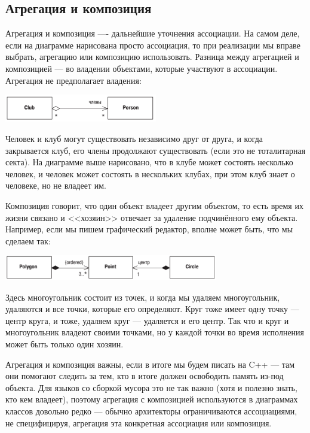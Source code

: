 \documentclass[a5paper]{article}
\begin{document}
\subsection{Агрегация и композиция}

Агрегация и композиция ---- дальнейшие уточнения ассоциации. На самом деле, если на диаграмме нарисована просто ассоциация, то при реализации мы вправе выбрать, агрегацию или композицию использовать. Разница между агрегацией и композицией --- во владении объектами, которые участвуют в ассоциации. Агрегация не предполагает владения:

\begin{center}
    \includegraphics[width=0.5\textwidth]{aggregations.png}
\end{center}

Человек и клуб могут существовать независимо друг от друга, и когда закрывается клуб, его члены продолжают существовать (если это не тоталитарная секта). На диаграмме выше нарисовано, что в клубе может состоять несколько человек, и человек может состоять в нескольких клубах, при этом клуб знает о человеке, но не владеет им.

Композиция говорит, что один объект владеет другим объектом, то есть время их жизни связано и <<хозяин>> отвечает за удаление подчинённого ему объекта. Например, если мы пишем графический редактор, вполне может быть, что мы сделаем так:

\begin{center}
    \includegraphics[width=0.7\textwidth]{compositions.png}
\end{center}

Здесь многоугольник состоит из точек, и когда мы удаляем многоугольник, удаляются и все точки, которые его определяют. Круг тоже имеет одну точку --- центр круга, и тоже, удаляем круг --- удаляется и его центр. Так что и круг и многоугольник владеют своими точками, но у каждой точки во время исполнения может быть только один хозяин.

Агрегация и композиция важны, если в итоге мы будем писать на C++ --- там они помогают следить за тем, кто в итоге должен освободить память из-под объекта. Для языков со сборкой мусора это не так важно (хотя и полезно знать, кто кем владеет), поэтому агрегация с композицией используются в диаграммах классов довольно редко --- обычно архитекторы ограничиваются ассоциациями, не специфицируя, агрегация эта конкретная ассоциация или композиция.
\end{document}
